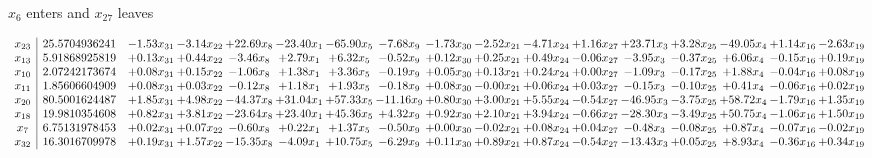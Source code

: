 \documentclass[9pt]{article}
\begin{document}
 $ x_{6} $ enters and $ x_{27} $ leaves 

 \[\begin{array}{c| c c@{\hskip 2pt} c@{\hskip 2pt} c@{\hskip 2pt} c@{\hskip 2pt} c@{\hskip 2pt} c@{\hskip 2pt} c@{\hskip 2pt} c@{\hskip 2pt} c@{\hskip 2pt} c@{\hskip 2pt} c@{\hskip 2pt} c@{\hskip 2pt} c@{\hskip 2pt} c@{\hskip 2pt} c@{\hskip 2pt} }
 x_{23}   &  25.5704936241 & -1.53 x_{31} & -3.14 x_{22} & + 22.69 x_{8} & -23.40 x_{1} & -65.90 x_{5} & -7.68 x_{9} & -1.73 x_{30} & -2.52 x_{21} & -4.71 x_{24} & +  1.16 x_{27} & + 23.71 x_{3} & +  3.28 x_{25} & -49.05 x_{4} & +  1.14 x_{16} & -2.63 x_{19}\\
 x_{13}   &  5.91868925819 & +  0.13 x_{31} & +  0.44 x_{22} & -3.46 x_{8} & +  2.79 x_{1} & +  6.32 x_{5} & -0.52 x_{9} & +  0.12 x_{30} & +  0.25 x_{21} & +  0.49 x_{24} & -0.06 x_{27} & -3.95 x_{3} & -0.37 x_{25} & +  6.06 x_{4} & -0.15 x_{16} & +  0.19 x_{19}\\
 x_{10}   &  2.07242173674 & +  0.08 x_{31} & +  0.15 x_{22} & -1.06 x_{8} & +  1.38 x_{1} & +  3.36 x_{5} & -0.19 x_{9} & +  0.05 x_{30} & +  0.13 x_{21} & +  0.24 x_{24} & +  0.00 x_{27} & -1.09 x_{3} & -0.17 x_{25} & +  1.88 x_{4} & -0.04 x_{16} & +  0.08 x_{19}\\
 x_{11}   &  1.85606604909 & +  0.08 x_{31} & +  0.03 x_{22} & -0.12 x_{8} & +  1.18 x_{1} & +  1.93 x_{5} & -0.18 x_{9} & +  0.08 x_{30} & -0.00 x_{21} & +  0.06 x_{24} & +  0.03 x_{27} & -0.15 x_{3} & -0.10 x_{25} & +  0.41 x_{4} & -0.06 x_{16} & +  0.02 x_{19}\\
 x_{20}   &  80.5001624487 & +  1.85 x_{31} & +  4.98 x_{22} & -44.37 x_{8} & + 31.04 x_{1} & + 57.33 x_{5} & -11.16 x_{9} & +  0.80 x_{30} & +  3.00 x_{21} & +  5.55 x_{24} & -0.54 x_{27} & -46.95 x_{3} & -3.75 x_{25} & + 58.72 x_{4} & -1.79 x_{16} & +  1.35 x_{19}\\
 x_{18}   &  19.9810354608 & +  0.82 x_{31} & +  3.81 x_{22} & -23.64 x_{8} & + 23.40 x_{1} & + 45.36 x_{5} & +  4.32 x_{9} & +  0.92 x_{30} & +  2.10 x_{21} & +  3.94 x_{24} & -0.66 x_{27} & -28.30 x_{3} & -3.49 x_{25} & + 50.75 x_{4} & -1.06 x_{16} & +  1.50 x_{19}\\
 x_{7}   &  6.75131978453 & +  0.02 x_{31} & +  0.07 x_{22} & -0.60 x_{8} & +  0.22 x_{1} & +  1.37 x_{5} & -0.50 x_{9} & +  0.00 x_{30} & -0.02 x_{21} & +  0.08 x_{24} & +  0.04 x_{27} & -0.48 x_{3} & -0.08 x_{25} & +  0.87 x_{4} & -0.07 x_{16} & -0.02 x_{19}\\
 x_{32}   &  16.3016709978 & +  0.19 x_{31} & +  1.57 x_{22} & -15.35 x_{8} & -4.09 x_{1} & + 10.75 x_{5} & -6.29 x_{9} & +  0.11 x_{30} & +  0.89 x_{21} & +  0.87 x_{24} & -0.54 x_{27} & -13.43 x_{3} & +  0.05 x_{25} & +  8.93 x_{4} & -0.36 x_{16} & +  0.34 x_{19}\\

\end{array}\]
\end{document}
